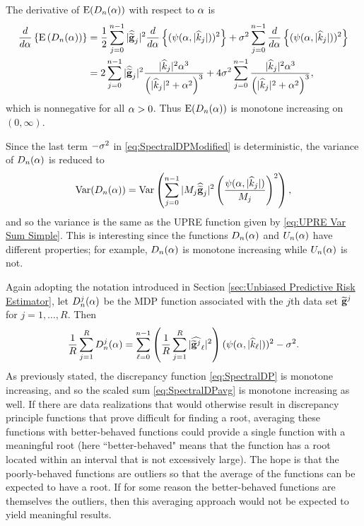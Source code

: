 The derivative of $\operatorname{E}(D_n(\alpha))$ with respect to $\alpha$ is
\begin{align*}
\frac{d}{d\alpha}\left\{\operatorname{E}\left(D_n(\alpha)\right)\right\} &= \frac{1}{2}\sum_{j = 0}^{n-1} |\widehat{\widetilde{\mathbf{g}}}_j|^2 \frac{d}{d\alpha}\left\{(\psi(\alpha,|\widehat{k}_j|))^2\right\} + \sigma^2\sum_{j = 0}^{n-1} \frac{d}{d\alpha}\left\{(\psi(\alpha,|\widehat{k}_j|))^2\right\} \\
&= 2\sum_{j = 0}^{n-1} |\widehat{\widetilde{\mathbf{g}}}_j|^2\frac{|\widehat{k}_j|^2\alpha^3}{\left(|\widehat{k}_j|^2 + \alpha^2\right)^3} + 4\sigma^2 \sum_{j = 0}^{n-1} \frac{|\widehat{k}_j|^2\alpha^3}{\left(|\widehat{k}_j|^2 + \alpha^2\right)^3},
\end{align*}
which is nonnegative for all $\alpha > 0$. Thus $\operatorname{E}(D_n(\alpha))$ is monotone increasing on $(0,\infty)$. \par
Since the last term $-\sigma^2$ in \eqref{eq:SpectralDPModified} is deterministic, the variance of $D_n(\alpha)$ is reduced to
\[\operatorname{Var}(D_n(\alpha)) = \operatorname{Var}\left(\sum_{j = 0}^{n-1} |M_j\widehat{\widetilde{\mathbf{g}}}_j|^2\left(\frac{\psi(\alpha,|\widehat{k}_j|)}{M_j}\right)^2\right),\]
and so the variance is the same as the UPRE function given by \eqref{eq:UPRE Var Sum Simple}. This is interesting since the functions  $D_n(\alpha)$ and $U_n(\alpha)$ have different properties; for example, $D_n(\alpha)$ is monotone increasing while $U_n(\alpha)$ is not. \par 
Again adopting the notation introduced in Section \ref{sec:Unbiased Predictive Risk Estimator}, let $D_n^j(\alpha)$ be the MDP function associated with the $j$th data set $\widetilde{\mathbf{g}}^j$ for $j = 1,\ldots,R$. Then 
\begin{equation}
\frac{1}{R}\sum_{j=1}^R D_n^j(\alpha)  = \sum_{\ell = 0}^{n-1} \left(\frac{1}{R} \sum_{j=1}^R |\widehat{\widetilde{\mathbf{g}}^j}_\ell|^2\right)(\psi(\alpha,|\widehat{k}_\ell|))^2 - \sigma^2. 
\label{eq:SpectralDPavg}
\end{equation}
As previously stated, the discrepancy function \eqref{eq:SpectralDP} is monotone increasing, and so the scaled sum \eqref{eq:SpectralDPavg} is monotone increasing as well. If there are data realizations that would otherwise result in discrepancy principle functions that prove difficult for finding a root, averaging these functions with better-behaved functions could provide a single function with a meaningful root (here ``better-behaved" means that the function has a root located within an interval that is not excessively large). The hope is that the poorly-behaved functions are outliers so that the average of the functions can be expected to have a root. If for some reason the better-behaved functions are themselves the outliers, then this averaging approach would not be expected to yield meaningful results.


